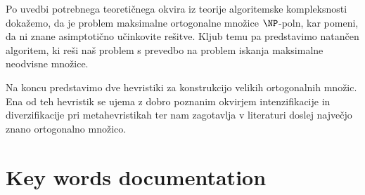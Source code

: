 \documentclass[12pt,a4paper,titlepage,openany]{report}
\begin{document}
\begin{center}
{{Po uvedbi potrebnega teoretičnega okvira iz teorije algoritemske kompleksnosti dokažemo, da je problem maksimalne ortogonalne množice $\NP$-poln, kar pomeni, da ni znane asimptotično učinkovite rešitve. Kljub temu pa predstavimo natančen algoritem, ki reši naš problem s prevedbo na problem iskanja maksimalne neodvisne množice.

Na koncu predstavimo dve hevristiki za konstrukcijo velikih ortogonalnih množic. Ena od teh hevristik se ujema z dobro poznanim okvirjem intenzifikacije in diverzifikacije pri metahevristikah ter nam zagotavlja v literaturi doslej največjo znano ortogonalno množico.
\vspace{0.2cm}
}}
\end{center}

\newpage

\section*{Key words documentation}

\medskip
\end{document}
